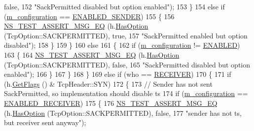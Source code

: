\begin{DoxyCode}
{      false},
152                                      \textcolor{stringliteral}{"SackPermitted disabled but option enabled"});
153             \}
154           \textcolor{keywordflow}{else} \textcolor{keywordflow}{if} (\hyperlink{classSackPermittedTestCase_aff7ae43e44e4fb3f7286e9d3083f2732}{m\_configuration} == \hyperlink{classSackPermittedTestCase_a2dc95ae5e965bc36df7ea84c64723493aef344cc4eec6eedc3e644b86edc4db95}{ENABLED\_SENDER})
155             \{
156               \hyperlink{group__testing_ga2a9d78cffb3db8e867c35fff0b698cf5}{NS\_TEST\_ASSERT\_MSG\_EQ} (h.\hyperlink{classns3_1_1TcpHeader_aacc07bdab91925f1cddf9bcb1ae91d13}{HasOption} (TcpOption::SACKPERMITTED), \textcolor{keyword}{
      true},
157                                      \textcolor{stringliteral}{"SackPermitted enabled but option disabled"});
158             \}
159         \}
160       \textcolor{keywordflow}{else}
161         \{
162           \textcolor{keywordflow}{if} (\hyperlink{classSackPermittedTestCase_aff7ae43e44e4fb3f7286e9d3083f2732}{m\_configuration} != \hyperlink{classSackPermittedTestCase_a2dc95ae5e965bc36df7ea84c64723493a895f2f11241beaf1334839f4056a0531}{ENABLED})
163             \{
164               \hyperlink{group__testing_ga2a9d78cffb3db8e867c35fff0b698cf5}{NS\_TEST\_ASSERT\_MSG\_EQ} (h.\hyperlink{classns3_1_1TcpHeader_aacc07bdab91925f1cddf9bcb1ae91d13}{HasOption} (TcpOption::SACKPERMITTED), \textcolor{keyword}{
      false},
165                                      \textcolor{stringliteral}{"SackPermitted disabled but option enabled"});
166             \}
167         \}
168     \}
169   \textcolor{keywordflow}{else} \textcolor{keywordflow}{if} (who == \hyperlink{classns3_1_1TcpGeneralTest_a29338e6b7137cad650c2ff835713f6eea2a9a39a8fe1edd25b643a48956b8ecff}{RECEIVER})
170     \{
171       \textcolor{keywordflow}{if} (h.\hyperlink{classns3_1_1TcpHeader_a0d04c5620ee147d4e01d56b9530e8db1}{GetFlags} () & TcpHeader::SYN)
172         \{
173           \textcolor{comment}{// Sender has not sent SackPermitted, so implementation should disable ts}
174           \textcolor{keywordflow}{if} (\hyperlink{classSackPermittedTestCase_aff7ae43e44e4fb3f7286e9d3083f2732}{m\_configuration} == \hyperlink{classSackPermittedTestCase_a2dc95ae5e965bc36df7ea84c64723493a3c0e8b65f47a69fca9d52f403274742c}{ENABLED\_RECEIVER})
175             \{
176               \hyperlink{group__testing_ga2a9d78cffb3db8e867c35fff0b698cf5}{NS\_TEST\_ASSERT\_MSG\_EQ} (h.\hyperlink{classns3_1_1TcpHeader_aacc07bdab91925f1cddf9bcb1ae91d13}{HasOption} (TcpOption::SACKPERMITTED), \textcolor{keyword}{
      false},
177                                      \textcolor{stringliteral}{"sender has not ts, but receiver sent anyway"});

\end{DoxyCode}
